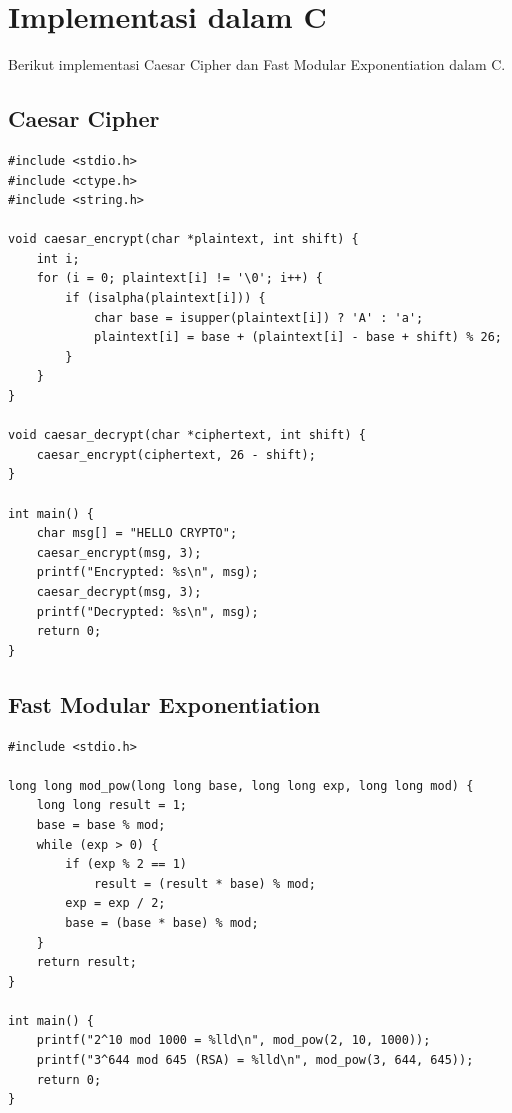 \section{Implementasi dalam C}

Berikut implementasi Caesar Cipher dan Fast Modular Exponentiation dalam C.

\subsection{Caesar Cipher}
\begin{lstlisting}[style=cstyle,caption={Implementasi Caesar Cipher dalam C}]
#include <stdio.h>
#include <ctype.h>
#include <string.h>

void caesar_encrypt(char *plaintext, int shift) {
    int i;
    for (i = 0; plaintext[i] != '\0'; i++) {
        if (isalpha(plaintext[i])) {
            char base = isupper(plaintext[i]) ? 'A' : 'a';
            plaintext[i] = base + (plaintext[i] - base + shift) % 26;
        }
    }
}

void caesar_decrypt(char *ciphertext, int shift) {
    caesar_encrypt(ciphertext, 26 - shift);
}

int main() {
    char msg[] = "HELLO CRYPTO";
    caesar_encrypt(msg, 3);
    printf("Encrypted: %s\n", msg);
    caesar_decrypt(msg, 3);
    printf("Decrypted: %s\n", msg);
    return 0;
}
\end{lstlisting}

\subsection{Fast Modular Exponentiation}
\begin{lstlisting}[style=cstyle,caption={Fast Modular Exponentiation dalam C}]
#include <stdio.h>

long long mod_pow(long long base, long long exp, long long mod) {
    long long result = 1;
    base = base % mod;
    while (exp > 0) {
        if (exp % 2 == 1)
            result = (result * base) % mod;
        exp = exp / 2;
        base = (base * base) % mod;
    }
    return result;
}

int main() {
    printf("2^10 mod 1000 = %lld\n", mod_pow(2, 10, 1000));
    printf("3^644 mod 645 (RSA) = %lld\n", mod_pow(3, 644, 645));
    return 0;
}
\end{lstlisting}

